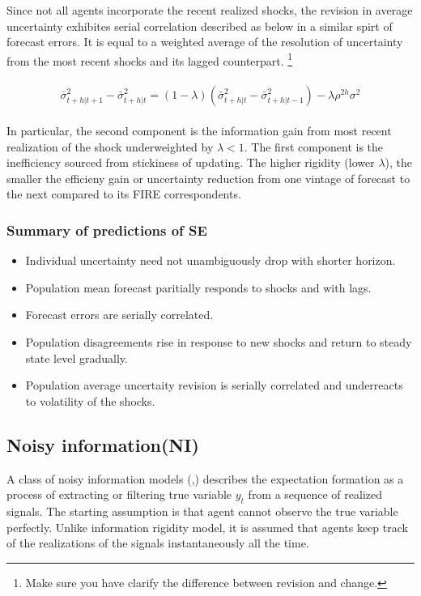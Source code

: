 \documentclass[]{article}
\begin{document}
Since not all agents incorporate the recent realized shocks, the revision in average uncertainty exhibites serial correlation described as below in a similar spirt of forecast errors. It is equal to a weighted average of the resolution of uncertainty from the most recent shocks and its lagged counterpart. \footnote{Make sure you have clarify the difference between revision and change.}


\begin{eqnarray}\label{VarSERv}
\begin{aligned}
\bar \sigma^2_{t+h|t+1} - \bar \sigma^2_{t+h|t} = (1-\lambda)(
\bar \sigma^2_{t+h|t} - \bar \sigma^2_{t+h|t-1}) -\lambda \rho^{2h} \sigma^2 
\end{aligned}
\end{eqnarray}

 In particular, the second component is the information gain from most recent realization of the shock underweighted by $\lambda<1$. The first component is the inefficiency sourced from stickiness of updating. The higher rigidity (lower $\lambda$), the smaller the efficieny gain or uncertainty reduction from one vintage of forecast to the next compared to its FIRE correspondents. 

\subsubsection{Summary of predictions of SE}

\begin{itemize}
\item Individual uncertainty need not unambiguously drop with shorter horizon. 
\item Population mean forecast paritially responds to shocks and with lags. 
\item Forecast errors are serially correlated. 
\item Population disagreements rise in response to new shocks and return to steady state level gradually. 
\item Population average uncertaity revision is serially correlated and underreacts to volatility of the shocks.
 
\end{itemize}

\subsection{Noisy information(NI)}

A class of noisy information models (\citet{},\citet{}) describes the expectation formation as a process of extracting or filtering true variable $y_t$ from a sequence of realized signals. The starting assumption is that agent cannot observe the true variable perfectly. Unlike information rigidity model, it is assumed that agents keep track of the realizations of the signals instantaneously all the time. 
\end{document}

